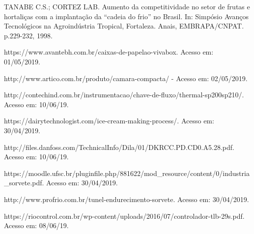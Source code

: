 \documentclass[10pt,a4paper]{article}
\begin{document}
\begin{thebibliography}{}
 TANABE C.S.; CORTEZ LAB. Aumento da competitividade no setor de frutas e hortaliças com a implantação da “cadeia do
frio” no Brasil. In: Simpósio Avanços Tecnológicos na Agroindústria Tropical, Fortaleza. Anais, EMBRAPA/CNPAT.
p.229-232, 1998.

 https://www.avantebh.com.br/caixas-de-papelao-vivabox. Acesso em: 01/05/2019.

 http://www.artico.com.br/produto/camara-compacta/ - Acesso em: 02/05/2019.

 http://contechind.com.br/instrumentacao/chave-de-fluxo/thermal-sp200sp210/. Acesso em: 10/06/19.

 https://dairytechnologist.com/ice-cream-making-process/. Acesso em: 30/04/2019.

 http://files.danfoss.com/TechnicalInfo/Dila/01/DKRCC.PD.CD0.A5.28.pdf. Acesso em: 10/06/19.

 https://moodle.ufsc.br/pluginfile.php/881622/mod\_resource/content/0/industria\_sorvete.pdf. Acesso em: 30/04/2019.

 http://www.profrio.com.br/tunel-endurecimento-sorvete. Acesso em: 30/04/2019.

 https://riocontrol.com.br/wp-content/uploads/2016/07/controlador-tlb-29s.pdf. Acesso em: 08/06/19.

\end{thebibliography}



\end{document}

